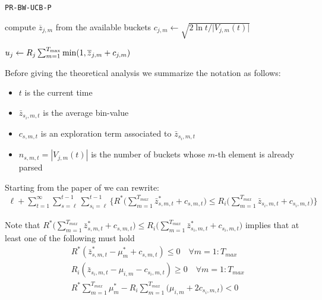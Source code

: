 \begin{algorithm}[H]
	\caption{\texttt{PR-BW-UCB-P}}
	\begin{scriptsize}
		\begin{algorithmic}[1]
			
			
			
			
			
			\State compute $\overline{z}_{j,m}$ from the available buckets \;
			\State$c_{j,m}\gets \sqrt{{2\ln t}/{\vert V_{j,m}(t) \vert}}$\;
			
			\EndFor		
			
			\State $u_j \gets R_j \sum_{m=1}^{T_{\textnormal{max}}} \min(1,\overline{z}_{j,m}+c_{j,m}) $\;	
			\EndFor
			
			
			
			
			\EndFunction
			
		\end{algorithmic}
	\end{scriptsize}
	\label{alg:Bound1}
\end{algorithm}

Before giving the theoretical analysis we summarize the notation as follows:

\begin{itemize}
	\item $t$ is the current time
	\item $\bar{z}_{s_i,m,t}$  is the average bin-value 
	\item $c_{s,m,t}$ is an exploration term associated to $\bar{z}_{s_i,m,t}$
	\item $n_{s,m,t}=|V_{j,m}(t)|$ is the number of buckets whose $m$-th element is already parsed
\end{itemize}

Starting from the paper of \cite{auer2002finite} we can rewrite:
\begin{align}
	\ell + \sum_{t=1}^\infty \sum_{s=\ell}^{t-1} \sum_{s_i=\ell}^{t-1} \Biggl\{ R^*\Bigg(\sum_{m=1}^{T_{max}}\bar{z}^*_{s,m,t} + c_{s,m,t}\Bigg) \le R_i\Bigg(\sum_{m=1}^{T_{max}}\bar{z}_{s_i,m,t} + c_{s_i,m,t}\Bigg) \Biggl\} 
\end{align}

Note that $R^*\big(\sum_{m=1}^{T_{max}}\bar{z}^*_{s,m,t} + c_{s,m,t}\big) \le R_i\big(\sum_{m=1}^{T_{max}}\bar{z}^*_{s_i,m,t} + c_{s_i,m,t}\big)$ implies that at least one of the following must hold
\begin{align}
	&R^*(\bar{z}^*_{s,m,t} - \mu^*_m + c_{s,m,t}) \le 0 \quad \forall m=1:T_{max} \label{diseq1}\\
	&R_i(\bar{z}_{s_i,m,t} - \mu_{i,m} - c_{s_i,m,t}) \ge 0 \quad \forall m=1:T_{max} \label{diseq2}\\
	&R^*\sum_{m=1}^{T_{max}}\mu^*_{m} - R_i \sum_{m=1}^{T_{max}}\Bigg( \mu_{i,m} +2c_{s_i,m,t}\Bigg) < 0 \label{diseq3}
\end{align}

